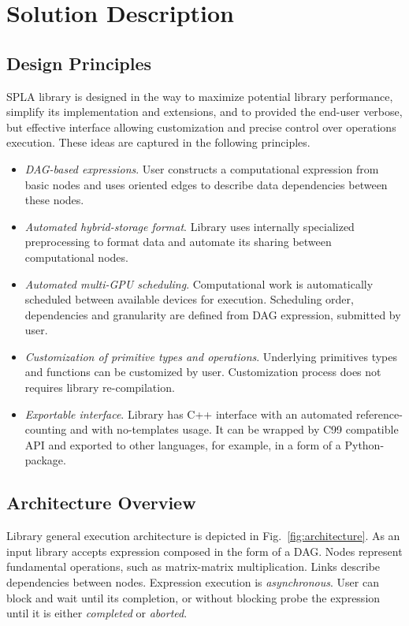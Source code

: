 \section{Solution Description}

\subsection{Design Principles}

SPLA library is designed in the way to maximize potential library performance, simplify its implementation and extensions, and to provided the end-user verbose, but effective interface allowing customization and precise control over operations execution. These ideas are captured in the following principles.

\begin{itemize}
    \item \textit{DAG-based expressions}. User constructs a computational expression from basic nodes and uses oriented edges to describe data dependencies between these nodes. 
    \item \textit{Automated hybrid-storage format}. Library uses internally specialized preprocessing to format data and automate its sharing between computational nodes.
    \item \textit{Automated multi-GPU scheduling}. Computational work is automatically scheduled between available devices for execution. Scheduling order, dependencies and granularity are defined from DAG expression, submitted by user.
    \item \textit{Customization of primitive types and operations}. Underlying primitives types and functions can be customized by user. Customization process does not requires library re-compilation. 
    \item \textit{Exportable interface}. Library has C++ interface with an automated reference-counting and with no-templates usage. It can be wrapped by C99 compatible API and exported to other languages, for example, in a form of a Python-package.
\end{itemize}

\subsection{Architecture Overview}

Library general execution architecture is depicted in Fig.~\ref{fig:architecture}. As an input library accepts expression composed in the form of a DAG.
Nodes represent fundamental operations, such as matrix-matrix multiplication. 
Links describe dependencies between nodes.
Expression execution is \textit{asynchronous}. 
User can block and wait until its completion, or without blocking probe the expression until it is either \textit{completed} or \textit{aborted}. 

